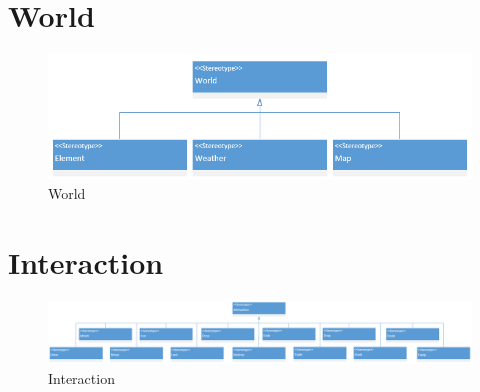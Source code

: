 \section*{World}
\begin{figure}[H]
    \includegraphics[width=14cm]{10_img/Z_annexeA/world.PNG} 
    \caption{World}
\end{figure}


\section*{Interaction}
\begin{figure}
    \includegraphics[width=20cm]{10_img/Z_annexeA/interaction.PNG} 
    \caption{Interaction}
\end{figure}